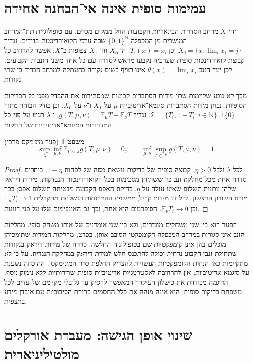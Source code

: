 \documentclass[11pt,a4paper]{article}
\newtheorem{theorem}{משפט}[section]
\theoremstyle{definition}
\theoremstyle{remark}
\newcommand{\bits}{\{0,1\}}
\begin{document}
\section{עמימות סופית אינה אי־הבחנה אחידה}
יהי $X$ מרחב הסדרות הבינאריות הקבועות החל ממקום מסוים, עם טופולוגיית תת־המרחב המושרית מן המכפלה $\bits^{\mathbb N}$ שבה ערכי הקואורדינטות בדידים. נגדיר $X_j=\{x:\lim_i x_i=j\}$ וכן $T_i(x)=x_i$. הן $X_0$ והן $X_1$ צפופות ב־$X$: אפשר להרחיב כל קבוצת קואורדינטות סופית שערכיה נקבעו מראש לסדרה עם כל אחד משני הזנבות הקבועים. לכן יעד הזנב $\theta(x)=\lim_i x_i$ אינו רציף בשום נקודה כהעתקה למרחב הבדיד בן שתי נקודות.

מכך לא נובע שקיימות שתי מידות הסתברות קבועות שמסתירות את ההבדל מפני כל הבדיקות הסופיות. נבחן מידות הסתברות סיגמא־אדיטיביות $\mu$ על $X_1$ ו־$\nu$ על $X_0$, וכן בודק הבוחר מתוך $\mathcal T=\{T_i,1-T_i:i\in\mathbb N\}\cup\{0\}$. נגדיר $g(T,\mu,\nu)=\mathbb E_\mu T-\mathbb E_\nu T$, ו־$\lambda$ תנוע על פני כל התערובות הסיגמא־אדיטיביות של בדיקות.
\begin{theorem}[פער מינימקס מרבי]\label{thm:mm}
\[
\sup_\lambda\inf_{\mu,\nu}\mathbb E_{T\sim\lambda}g(T,\mu,\nu)=0,
\qquad
\inf_{\mu,\nu}\sup_{T\in\mathcal T}g(T,\mu,\nu)=1.
\]
\end{theorem}
\begin{proof}
לכל $\lambda$ ולכל $\eta>0$, קבוצה סופית של בדיקות נושאת מסה של לפחות $1-\eta$. בוחרים סדרה אחת מכל מחלקת זנב כך ששתיהן מסכימות בכל הקואורדינטות הנבדקות. מידות דיראק שלהן נותנות תשלום שאינו עולה על $\eta$. בדיקת האפס הקבועה מבטיחה תשלום אפס; בכך מוכח השוויון הראשון. לכל זוג מידות קביל, ממשפט ההתכנסות הנשלטת מתקבלים $\mathbb E_\mu T_i\to1$ וכן $\mathbb E_\nu T_i\to0$. הסופרמום הוא אחת, וכך גם האינפימום שלו על פני הזוגות.
\end{proof}
הפער הוא בין שני משחקים מוגדרים, ולא בין שני אומדנים של אותו משחק סופי. מחלקות הזנב אינן סגורות במרחב המכפלה הקומפקטי הסובב אותן. בפרט, מחלקות המידות שתומכיהן מוכלים בהן אינן קומפקטיות שם בטופולוגיה החלשה: סדרה של מידות דיראק בנקודות שתחילת זנבן הקבוע נדחית יכולה להתכנס חלש למידת דיראק במחלקה הנגדית. על כן לא מתקיימות כאן הנחות הקומפקטיות העשויות להצדיק החלפת סדר המינימקס \cite{sion}. ההוכחה נשענת על סיגמא־אדיטיביות; אין להרחיבה לאסטרטגיות אדיטיביות סופית שרירותיות ללא נימוק נוסף. הדוגמה מבודדת את כישלון העיקרון המאפשר להסיק עֵד גלובלי מקיומם של עדים לכל משפחת בדיקות סופית; היא אינה מזהה את כלל החסמים בתורת הסיבוכיות עם אובדן מידע בתצפית.

\section{שינוי אופן הגישה: מעבדת אורקלים מולטיליניארית}
\end{document}
